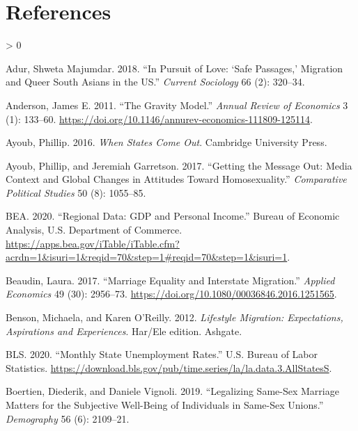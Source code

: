 \documentclass[
  11pt,
]{article}
\newlength{\cslhangindent}
\newenvironment{CSLReferences}[2] %
 {%
  \setlength{\parindent}{0pt}
  \ifodd #1 \everypar{\setlength{\hangindent}{\cslhangindent}}\ignorespaces\fi
  \ifnum #2 > 0
  \setlength{\parskip}{#2\baselineskip}
  \fi
 }%
 {}
\begin{document}
\hypertarget{references}{%
\section{References}\label{references}}

\setlength{\parindent}{-0.2in}
\setlength{\leftskip}{0.2in}
\setlength{\parskip}{8pt}

\noindent

\hypertarget{refs}{}
\begin{CSLReferences}{1}{0}
\leavevmode\hypertarget{ref-adur_2018}{}%
Adur, Shweta Majumdar. 2018. {``In Pursuit of Love: {`{Safe} Passages,'} Migration and Queer {South} {Asians} in the {US}.''} \emph{Current Sociology} 66 (2): 320--34.

\leavevmode\hypertarget{ref-anderson_2011}{}%
Anderson, James E. 2011. {``The {Gravity} {Model}.''} \emph{Annual Review of Economics} 3 (1): 133--60. \url{https://doi.org/10.1146/annurev-economics-111809-125114}.

\leavevmode\hypertarget{ref-ayoub_2016}{}%
Ayoub, Phillip. 2016. \emph{When {States} {Come} {Out}}. Cambridge University Press.

\leavevmode\hypertarget{ref-ayoub_2017}{}%
Ayoub, Phillip, and Jeremiah Garretson. 2017. {``Getting the Message Out: {Media} Context and Global Changes in Attitudes Toward Homosexuality.''} \emph{Comparative Political Studies} 50 (8): 1055--85.

\leavevmode\hypertarget{ref-bea_2020}{}%
BEA. 2020. {``Regional {Data}: {GDP} and {Personal} {Income}.''} Bureau of Economic Analysis, U.S. Department of Commerce. \url{https://apps.bea.gov/iTable/iTable.cfm?acrdn=1\&isuri=1\&reqid=70\&step=1\#reqid=70\&step=1\&isuri=1}.

\leavevmode\hypertarget{ref-beaudin_2017}{}%
Beaudin, Laura. 2017. {``Marriage Equality and Interstate Migration.''} \emph{Applied Economics} 49 (30): 2956--73. \url{https://doi.org/10.1080/00036846.2016.1251565}.

\leavevmode\hypertarget{ref-benson_2012}{}%
Benson, Michaela, and Karen O'Reilly. 2012. \emph{Lifestyle {Migration}: {Expectations}, {Aspirations} and {Experiences}}. Har/Ele edition. Ashgate.

\leavevmode\hypertarget{ref-bls_2020}{}%
BLS. 2020. {``Monthly State Unemployment Rates.''} U.S. Bureau of Labor Statistics. \url{https://download.bls.gov/pub/time.series/la/la.data.3.AllStatesS}.

\leavevmode\hypertarget{ref-boertien_2019}{}%
Boertien, Diederik, and Daniele Vignoli. 2019. {``Legalizing Same-Sex Marriage Matters for the Subjective Well-Being of Individuals in Same-Sex Unions.''} \emph{Demography} 56 (6): 2109--21.


\end{CSLReferences}
\end{document}
